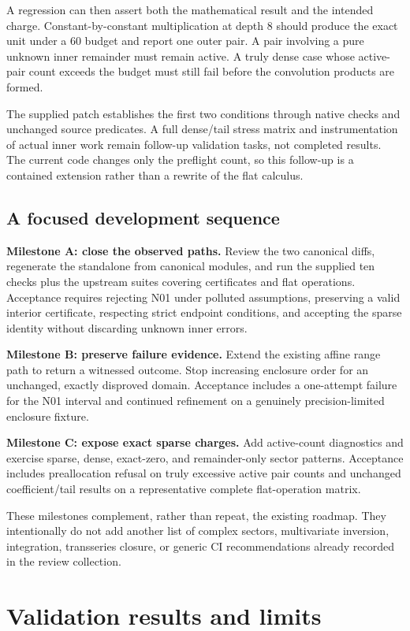 \documentclass[11pt,a4paper]{article}
\begin{document}
A regression can then assert both the mathematical result and the intended charge. Constant-by-constant multiplication at depth 8 should produce the exact unit under a 60 budget and report one outer pair. A pair involving a pure unknown inner remainder must remain active. A truly dense case whose active-pair count exceeds the budget must still fail before the convolution products are formed.

The supplied patch establishes the first two conditions through native checks and unchanged source predicates. A full dense/tail stress matrix and instrumentation of actual inner work remain follow-up validation tasks, not completed results. The current code changes only the preflight count, so this follow-up is a contained extension rather than a rewrite of the flat calculus.

\subsection{A focused development sequence}
\textbf{Milestone A: close the observed paths.} Review the two canonical diffs, regenerate the standalone from canonical modules, and run the supplied ten checks plus the upstream suites covering certificates and flat operations. Acceptance requires rejecting N01 under polluted assumptions, preserving a valid interior certificate, respecting strict endpoint conditions, and accepting the sparse identity without discarding unknown inner errors.

\textbf{Milestone B: preserve failure evidence.} Extend the existing affine range path to return a witnessed outcome. Stop increasing enclosure order for an unchanged, exactly disproved domain. Acceptance includes a one-attempt failure for the N01 interval and continued refinement on a genuinely precision-limited enclosure fixture.

\textbf{Milestone C: expose exact sparse charges.} Add active-count diagnostics and exercise sparse, dense, exact-zero, and remainder-only sector patterns. Acceptance includes preallocation refusal on truly excessive active pair counts and unchanged coefficient/tail results on a representative complete flat-operation matrix.

These milestones complement, rather than repeat, the existing roadmap. They intentionally do not add another list of complex sectors, multivariate inversion, integration, transseries closure, or generic CI recommendations already recorded in the review collection.

\section{Validation results and limits}
\label{sec:validation}
\end{document}
